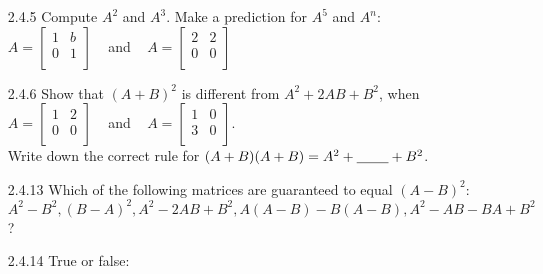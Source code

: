 \documentclass[10pt,twoside,reqno]{article}
\begin{document}
\begin{enumerate}
\item[2.4.5]Compute $A^2$ and $A^3$. Make a prediction for $A^5$ and $A^n$: \\
\vspace{3mm}
\hspace{130pt}
$
$$
A=
\begin{bmatrix}
1&b \\
0&1 \\
\end{bmatrix}
\hspace{10pt}
$$
$
and
$
$$
\hspace{10pt}
A=
\begin{bmatrix}
2&2 \\
0&0 \\
\end{bmatrix}
$$
$\\
\vspace{3mm}
\item[2.4.6]Show that $(A + B)^2$ is different from $A^2 + 2AB + B^2$, when \\
\vspace{3mm}
\hspace{130pt}
$
$$
A=
\begin{bmatrix}
1&2 \\
0&0 \\
\end{bmatrix}
\hspace{10pt}
$$
$
and
$
$$
\hspace{10pt}
A=
\begin{bmatrix}
1&0 \\
3&0 \\
\end{bmatrix}
$$
$.\\
\vspace{3mm} 
Write down the correct rule for $(A + B)(A + B) = A^2 + \underline{\hspace{8mm}} + B^2$.
\vspace{3mm}
\item[2.4.13]Which of the following matrices are guaranteed to equal $(A - B)^2$:\hspace{15pt}$A^2 - B^2, (B - A)^2, A^2 - 2AB + B^2, A(A - B) - B(A - B), A^2 - AB - BA + B^2$? 
\vspace{3mm}
\item[2.4.14]True or false: \\

\end{enumerate}
\end{document}
